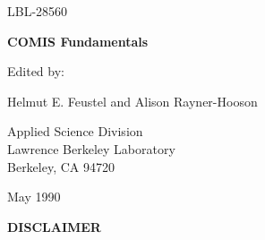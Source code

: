 \documentclass[12pt]{report}
\begin{document}
\begin{titlepage}
\begin{flushright}
LBL-28560
\end{flushright}
\vspace{0.75in}
\begin{center}
\Huge
\textbf{COMIS Fundamentals}
\vspace{1in}

\Large
Edited by:

Helmut E. Feustel and Alison Rayner-Hooson

\vspace{0.75in}

Applied Science Division\\
Lawrence Berkeley Laboratory\\
Berkeley, CA 94720

\vspace{0.5in}

May 1990
\end{center}
\end{titlepage}
\begin{center}
\textbf{DISCLAIMER}
\end{center}
\end{document}
